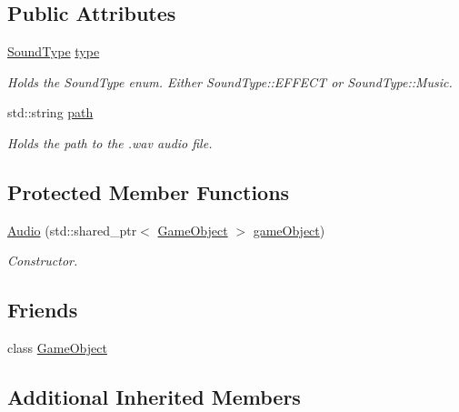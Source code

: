 \subsection*{Public Attributes}
\begin{DoxyCompactItemize}
\item 
\hyperlink{namespace_mason_a158d651086d1ba1aacc4c37125b27657}{Sound\+Type} \hyperlink{class_mason_1_1_audio_a100d9da58685f865bf03dcf44a55fb63}{type}
\begin{DoxyCompactList}\small\item\em Holds the Sound\+Type enum. Either Sound\+Type\+::\+E\+F\+F\+E\+CT or Sound\+Type\+::\+Music. \end{DoxyCompactList}\item 
std\+::string \hyperlink{class_mason_1_1_audio_a762cc6174ce20a011fe1e3a36e649204}{path}
\begin{DoxyCompactList}\small\item\em Holds the path to the .wav audio file. \end{DoxyCompactList}\end{DoxyCompactItemize}
\subsection*{Protected Member Functions}
\begin{DoxyCompactItemize}
\item 
\hyperlink{class_mason_1_1_audio_aa65245dcba1c0a373b7130e7e36306c2}{Audio} (std\+::shared\+\_\+ptr$<$ \hyperlink{class_mason_1_1_game_object}{Game\+Object} $>$ \hyperlink{class_mason_1_1_component_abaa67b569d0a70e26a4606f4a099a925}{game\+Object})
\begin{DoxyCompactList}\small\item\em Constructor. \end{DoxyCompactList}\end{DoxyCompactItemize}
\subsection*{Friends}
\begin{DoxyCompactItemize}
\item 
class \hyperlink{class_mason_1_1_audio_a00df87c957d8f7ee0fc51f07a0542f4a}{Game\+Object}
\end{DoxyCompactItemize}
\subsection*{Additional Inherited Members}


